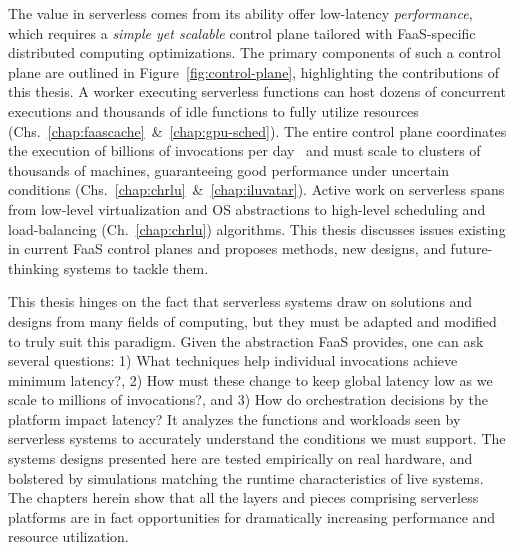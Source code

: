 
The value in serverless comes from its ability offer low-latency \emph{performance}, which requires a \emph{simple yet scalable} control plane tailored with FaaS-specific distributed computing optimizations.
The primary components of such a control plane are outlined in Figure~\ref{fig:control-plane}, highlighting the contributions of this thesis.
A worker executing serverless functions can host dozens of concurrent executions and thousands of idle functions to fully utilize resources (Chs.~\ref{chap:faascache}~\&~\ref{chap:gpu-sched}).
The entire control plane coordinates the execution of billions of invocations per day~\cite{sahraei2023xfaas} and must scale to clusters of thousands of machines, guaranteeing good performance under uncertain conditions (Chs.~\ref{chap:chrlu}~\&~\ref{chap:iluvatar}).
Active work on serverless spans from low-level virtualization and OS abstractions to high-level scheduling and load-balancing (Ch.~\ref{chap:chrlu}) algorithms.
This thesis discusses issues existing in current FaaS control planes and proposes methods, new designs, and future-thinking systems to tackle them.

This thesis hinges on the fact that serverless systems draw on solutions and designs from many fields of computing, but they must be adapted and modified to truly suit this paradigm.
Given the abstraction FaaS provides, one can ask several questions: 1) What techniques help individual invocations achieve minimum latency?, 2) How must these change to keep global latency low as we scale to millions of invocations?, and 3) How do orchestration decisions by the platform impact latency?
It analyzes the functions and workloads seen by serverless systems to accurately understand the conditions we must support.
The systems designs presented here are tested empirically on real hardware, and bolstered by simulations matching the runtime characteristics of live systems.
The chapters herein show that all the layers and pieces comprising serverless platforms are in fact opportunities for dramatically increasing performance and resource utilization.

